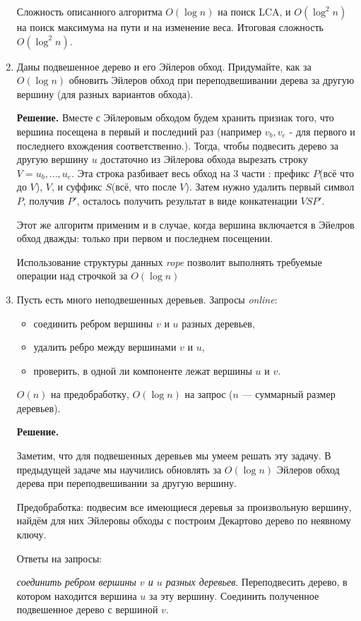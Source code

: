 \begin{enumerate}
	Сложность описанного алгоритма $O(\log n)$ на поиск LCA, и $O(\log^2n)$ на поиск максимума на пути и на 
	изменение веса. Итоговая сложность $O(\log^2 n)$.
	\item Даны подвешенное дерево и его Эйлеров обход. Придумайте, как за $O(\log n)$ обновить Эйлеров обход при 
	переподвешивании дерева за другую вершину (для разных вариантов обхода).
	
	\textbf{Решение.} Вместе с Эйлеровым обходом будем хранить признак того, что вершина посещена в первый и 
	последний раз (например $v_b, v_e$ - для первого и последнего вхождения соответственно.). Тогда, чтобы 
	подвесить дерево за другую вершину $u$ достаточно из Эйлерова обхода вырезать строку  $V = u_b,..., u_e$. Эта 
	строка разбивает весь обход на 3 части : префикс $P$(всё что до $V$), $V$, и суффикс $S$(всё, что после $V$). 
	Затем нужно удалить первый символ $P$, получив $P'$, осталось получить результат в виде конкатенации 
	$VSP'$.
	
	Этот же алгоритм применим и в случае, когда вершина включается в Эйелров обход дважды: только при первом и 
	последнем посещении.
	
	Использование структуры данных \textit{rope} позволит выполнять требуемые операции над строчкой за $O(\log n)$
	
	\item Пусть есть много неподвешенных деревьев. Запросы \textit{online}:
	\begin{itemize}
		\item соединить ребром вершины $v$ и $u$ разных деревьев,
		\item удалить ребро между вершинами $v$ и $u$,
		\item проверить, в одной ли компоненте лежат вершины $u$ и $v$.
	\end{itemize}
	
	$O(n)$ на предобработку, $O(\log n)$ на запрос ($n$ — суммарный размер деревьев).
	
	\textbf{Решение.} 
	
	Заметим, что для подвешенных деревьев мы умеем решать эту задачу. В предыдущей задаче мы научились обновлять 
	за $O(\log n)$ Эйлеров обход дерева при переподвешивании за другую вершину.
	
	Предобработка: подвесим все имеющиеся деревья за произвольную вершину, найдём для них Эйлеровы обходы  с 
	построим Декартово дерево по неявному ключу. 
	
	Ответы на запросы:
	
	\textit{соединить ребром вершины $v$ и $u$ разных деревьев}. Переподвесить дерево, в котором находится 
	вершина $u$ за эту вершину. Соединить полученное подвешенное дерево с вершиной $v$.
	

\end{enumerate}
